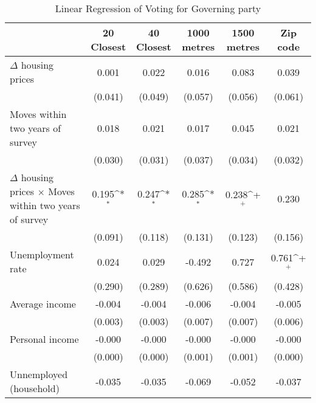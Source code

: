 \begin{table}[htbp]\centering
\def\sym#1{\ifmmode^{#1}\else\(^{#1}\)\fi}
\caption{Linear Regression of Voting for Governing party } \label{inddens}
\begin{tabular}{l*{5}{c}}
\hline\hline
                    &\multicolumn{1}{c}{20 Closest}&\multicolumn{1}{c}{40 Closest}&\multicolumn{1}{c}{1000 metres}&\multicolumn{1}{c}{1500 metres}&\multicolumn{1}{c}{Zip code}\\
\hline
$\Delta$ housing prices&       0.001       &       0.022       &       0.016       &       0.083       &       0.039       \\
                    &     (0.041)       &     (0.049)       &     (0.057)       &     (0.056)       &     (0.061)       \\
[1em]
Moves within two years of survey&       0.018       &       0.021       &       0.017       &       0.045       &       0.021       \\
                    &     (0.030)       &     (0.031)       &     (0.037)       &     (0.034)       &     (0.032)       \\
[1em]
$\Delta$ housing prices $\times$ Moves within two years of survey&       0.195\sym{*}&       0.247\sym{*}&       0.285\sym{*}&       0.238\sym{+}&       0.230       \\
                    &     (0.091)       &     (0.118)       &     (0.131)       &     (0.123)       &     (0.156)       \\
[1em]
Unemployment rate   &       0.024       &       0.029       &      -0.492       &       0.727       &       0.761\sym{+}\\
                    &     (0.290)       &     (0.289)       &     (0.626)       &     (0.586)       &     (0.428)       \\
[1em]
Average income      &      -0.004       &      -0.004       &      -0.006       &      -0.004       &      -0.005       \\
                    &     (0.003)       &     (0.003)       &     (0.007)       &     (0.007)       &     (0.006)       \\
[1em]
Personal income     &      -0.000       &      -0.000       &      -0.000       &      -0.000       &      -0.000       \\
                    &     (0.000)       &     (0.000)       &     (0.001)       &     (0.001)       &     (0.000)       \\
[1em]
Unnemployed (household)&      -0.035       &      -0.035       &      -0.069       &      -0.052       &      -0.037       \\

\end{tabular}
\end{table}
